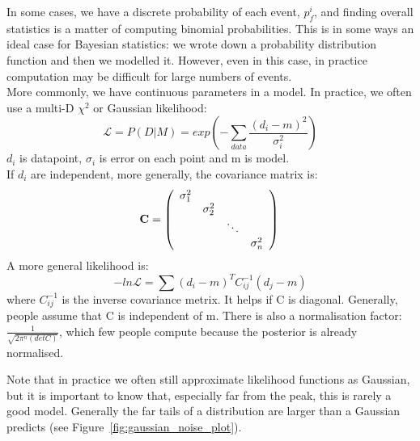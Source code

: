 \documentclass[12pt]{article}
\begin{document}
In some cases, we have a discrete probability of each event, $p^i_f$, and finding overall statistics is a matter of computing binomial probabilities. This is in some ways an ideal case for Bayesian statistics: we wrote down a probability distribution function and then we modelled it. However, even in this case, in practice computation may be difficult for large numbers of events.\\
More commonly, we have continuous parameters in a model. In practice, we often use a multi-D $\chi^2$ or Gaussian likelihood:
\begin{equation}
	\mathcal{L} = P(D|M) = exp(-\sum_{data}\frac{(d_i-m)^2}{\sigma_i^2})
\end{equation}
$d_i$ is datapoint, $\sigma_i$ is error on each point and m is model.\\
If $d_i$ are independent, more generally, the covariance matrix is:
\begin{displaymath}
\mathbf{C} =
\left( \begin{array}{cccc} \sigma_1^2 & \\
& \sigma^2_2 & &\\
& & \ddots & \\
& & & \sigma^2_n
\end{array} \right) \\
\end{displaymath}
A more general likelihood is:
\begin{equation}
	-ln\mathcal{L} = \sum (d_i - m)^T C_{ij}^{-1} (d_j -m)
\end{equation}
where $C_{ij}^{-1}$ is the inverse covariance metrix. It helps if C is diagonal. Generally, people assume that C is independent of m.
There is also a normalisation factor: $\frac{1}{\sqrt{2\pi^n (det C)}}$, which few people compute because the posterior is already normalised.

Note that in practice we often still approximate likelihood functions as Gaussian, but it is important to know that, especially far from the peak, this is rarely a good model. Generally the far tails of a distribution are larger than a Gaussian predicts (see Figure~\ref{fig:gaussian_noise_plot}).
\end{document}
